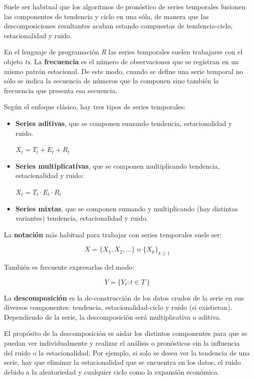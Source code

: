 \documentclass[]{book}
\begin{document}
Suele ser habitual que los algoritmos de pronóstico de series temporales
fusionen las componentes de tendencia y ciclo en una sóla, de manera que
las descomposiciones resultantes acaban estando compuestas de
tendencia-ciclo, estacionalidad y ruido.

En el lenguaje de programación \emph{R} las series temporales suelen
trabajarse con el objeto \emph{ts}. La \textbf{frecuencia} es el número
de observaciones que se registran en un mismo patrón estacional. De este
modo, cuando se define una serie temporal no sólo se indica la secuencia
de números que la componen sino también la frecuencia que presenta esa
secuencia.

Según el enfoque clásico, hay tres tipos de series temporales:

\begin{itemize}
\item
  \textbf{Series aditivas}, que se componen sumando tendencia,
  estacionalidad y ruido.

  \(X_{t} = T_{t} + E_{t} + R_{t}\)
\item
  \textbf{Series multiplicativas}, que se componen multiplicando
  tendencia, estacionalidad y ruido:

  \(X_{t} = T_{t} \cdot E_{t} \cdot R_{t}\)
\item
  \textbf{Series mixtas}, que se componen sumando y multiplicando (hay
  distintas variantes) tendencia, estacionalidad y ruido.
\end{itemize}

La \textbf{notación} más habitual para trabajar con series temporales
suele ser:

\[X = \{X_{1},X_{2},\dots \} \text{ o } \{X_{k}\}_{k\geq 1}\]

También es frecuente expresarlas del modo:

\[Y = \{Y_{t}:t\in T\ \}\]

La \textbf{descomposición} es la de-construcción de los datos crudos de
la serie en sus diversos componentes: tendencia, estacionalidad-ciclo y
ruido (si existieran). Dependiendo de la serie, la descomposición será
multiplicativa o aditiva.

El propósito de la descomposición es aislar los distintos componentes
para que se puedan ver individualmente y realizar el análisis o
pronósticos sin la influencia del ruido o la estacionalidad. Por
ejemplo, si solo se desea ver la tendencia de una serie, hay que
eliminar la estacionalidad que se encuentra en los datos, el ruido
debido a la aleatoriedad y cualquier ciclo como la expansión económica.
\end{document}
